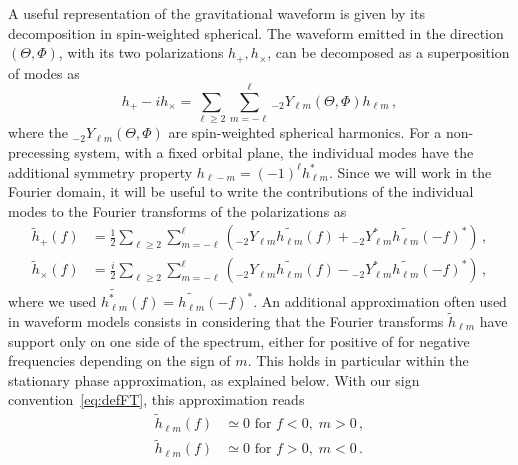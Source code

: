 \documentclass[aps,showpacs,%
prd,superscriptaddress,nofootinbib]{revtex4}
\newcommand{\be}{\begin{equation}}
\newcommand{\ee}{\end{equation}}
\newcommand{\nn}{\nonumber}
\begin{document}
A useful representation of the gravitational waveform is given by its decomposition in spin-weighted spherical. The waveform emitted in the direction $(\Theta, \Phi)$, with its two polarizations $h_{+},h_{\times}$, can be decomposed as a superposition of modes as~\cite{Thorne80}
\be\label{eq:defmodes}
	h_{+} - i h_{\times} = \sum\limits_{\ell \geq 2} \sum\limits_{m=-\ell}^{\ell} {}_{-2}Y_{\ell m}(\Theta,\Phi) h_{\ell m} \,,
\ee
where the ${}_{-2}Y_{\ell m}(\Theta,\Phi)$ are spin-weighted spherical harmonics. For a non-precessing system, with a fixed orbital plane, the individual modes have the additional symmetry property $h_{\ell -m} = (-1)^{\ell} h_{\ell m}^{*}$. Since we will work in the Fourier domain, it will be useful to write the contributions of the individual modes to the Fourier transforms of the polarizations as
\begin{subequations}\label{eq:hpcfrommodes}
\begin{align}
	\tilde{h}_{+}(f) &= \frac{1}{2} \sum\limits_{\ell \geq 2} \sum\limits_{m=-\ell}^{\ell} \left( {}_{-2}Y_{\ell m} \widetilde{h_{\ell m}}(f) + {}_{-2}Y_{\ell m}^{*} \widetilde{h_{\ell m}}(-f)^{*} \right) \,, \\
	\tilde{h}_{\times}(f) &= \frac{i}{2} \sum\limits_{\ell \geq 2} \sum\limits_{m=-\ell}^{\ell} \left( {}_{-2}Y_{\ell m} \widetilde{h_{\ell m}}(f) - {}_{-2}Y_{\ell m}^{*} \widetilde{h_{\ell m}}(-f)^{*} \right) \,,
\end{align}
\end{subequations}
where we used $\widetilde{h_{\ell m}^{*}}(f) = \widetilde{h_{\ell m}}(-f)^{*}$. An additional approximation often used in waveform models consists in considering that the Fourier transforms $\tilde{h}_{\ell m}$ have support only on one side of the spectrum, either for positive of for negative frequencies depending on the sign of $m$. This holds in particular within the stationary phase approximation, as explained below. With our sign convention~\eqref{eq:defFT}, this approximation reads
\begin{align}\label{eq:approxnegativef}
	\tilde{h}_{\ell m} (f) &\simeq 0 \text{ for } f<0, \; m>0 \nn\,,\\
	\tilde{h}_{\ell m} (f) &\simeq 0 \text{ for } f>0, \; m<0 \,.
\end{align}
\end{document}
